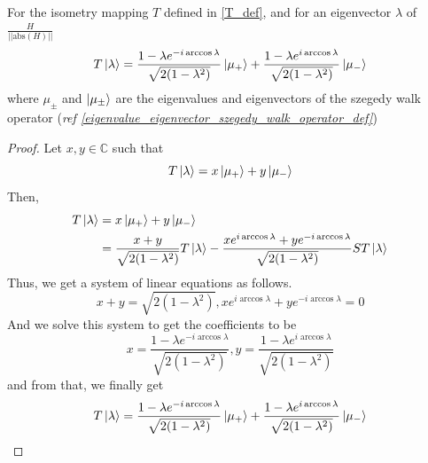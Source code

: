 \documentclass[
10pt, %
a4paper, %
oneside, %
headinclude,footinclude, %
BCOR5mm, %
]{scrartcl}
\begin{document}
\begin{theorem}\label{T_lambda}
For the isometry mapping $T$ defined in \ref{T_def}, and for an eigenvector $\lambda$ of $\frac{H}{||\text{abs}(H)||}$
$$T\ket\lambda=\frac{1-\lambda e^{-i\arccos\lambda}}{\sqrt{2(1-\lambda^2)}}\ket{\mu_+}+\frac{1-\lambda e^{i\arccos\lambda}}{\sqrt{2(1-\lambda^2)}}\ket{\mu_-}$$
where $\mu_{\pm}$ and $\ket{\mu_{\pm}}$ are the eigenvalues and eigenvectors of the szegedy walk operator (\textit{ref \ref{eigenvalue_eigenvector_szegedy_walk_operator_def}})
\end{theorem}
\begin{proof}
Let $x,y\in\mathbb{C}$ such that
$$T\ket\lambda=x\ket{\mu_+}+y\ket{\mu_-}$$
Then,
\begin{align*}
T\ket\lambda&=x\ket{\mu_+}+y\ket{\mu_-}\\
&=\frac{x+y}{\sqrt{2(1-\lambda^2)}}T\ket\lambda-\frac{xe^{i\arccos\lambda}+ye^{-i\arccos\lambda}}{\sqrt{2(1-\lambda^2)}}ST\ket\lambda
\end{align*}
Thus, we get a system of linear equations as follows.
$$x+y=\sqrt{2(1-\lambda^2)},xe^{i\arccos\lambda}+ye^{-i\arccos\lambda}=0$$
And we solve this system to get the coefficients to be
$$x=\frac{1-\lambda e^{-i\arccos\lambda}}{\sqrt{2(1-\lambda^2)}},y=\frac{1-\lambda e^{i\arccos\lambda}}{\sqrt{2(1-\lambda^2)}}$$
and from that, we finally get
$$T\ket\lambda=\frac{1-\lambda e^{-i\arccos\lambda}}{\sqrt{2(1-\lambda^2)}}\ket{\mu_+}+\frac{1-\lambda e^{i\arccos\lambda}}{\sqrt{2(1-\lambda^2)}}\ket{\mu_-}$$
\end{proof}
\end{document}
